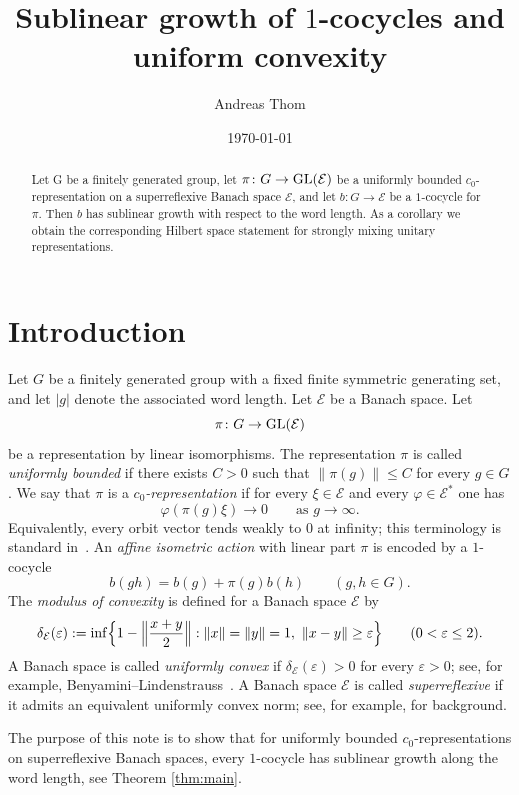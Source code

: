 \documentclass[a4paper,11pt]{amsproc}
\title[Sublinear growth and uniform convexity]{Sublinear growth of $1$-cocycles and \\ uniform convexity}
\author{Andreas Thom}
\date{\today}
\theoremstyle{remark}
\newcommand{\norm}[1]{\left\lVert #1\right\rVert}
\newcommand{\cE}{\mathcal E}
\begin{document}
\begin{abstract}

Let G be a finitely generated group, let $\pi \colon G \to {\rm GL}(\cE)$ be a uniformly bounded $c_0$-representation on a superreflexive Banach space $\cE$, and let $b \colon G \to \cE$ be a $1$-cocycle for $\pi$. Then $b$ has sublinear growth with respect to the word length. As a corollary we obtain the corresponding Hilbert space statement for strongly mixing unitary representations.
\end{abstract}

\maketitle

\section{Introduction}

Let $G$ be a finitely generated group with a fixed finite symmetric generating set, and let $|g|$ denote the associated word length. Let $\cE$ be a Banach space. Let
\[
\pi\colon G\to {\rm GL}(\cE)
\]
be a representation by linear isomorphisms. The representation $\pi$ is called \emph{uniformly bounded} if there exists $C>0$ such that $\norm{\pi(g)}\le C$ for every $g\in G$. We say that $\pi$ is a \emph{$c_{0}$-representation} if for every $\xi\in \cE$ and every $\varphi\in \cE^{\ast}$ one has
\[
\varphi(\pi(g)\xi)\to 0
\qquad\text{as } g\to\infty.
\]
Equivalently, every orbit vector tends weakly to $0$ at infinity; this terminology is standard in~\cite{BFGM07,CTVBanach08}.
An \emph{affine isometric action} with linear part $\pi$ is encoded by a $1$-cocycle
\[
b(gh)=b(g)+\pi(g)b(h)
\qquad (g,h\in G).
\]
The \emph{modulus of convexity} is defined for a Banach space $\cE$ by
\[
\delta_{\cE}(\varepsilon):=\inf\Bigl\{1-\Bigl\lVert\frac{x+y}{2}\Bigr\rVert: \norm{x}=\norm{y}=1,\ \norm{x-y}\ge \varepsilon\Bigr\}
\qquad (0<\varepsilon\le 2).
\]
A Banach space is called \emph{uniformly convex} if $\delta_{\cE}(\varepsilon)>0$ for every $\varepsilon>0$; see, for example, Benyamini--Lindenstrauss~\cite{BL00}. A Banach space $\cE$ is called \emph{superreflexive} if it admits an equivalent uniformly convex norm; see, for example, \cite{BFGM07,BL00} for background.

The purpose of this note is to show that for uniformly bounded $c_{0}$-representations on superreflexive Banach spaces, every $1$-cocycle has sublinear growth along the word length, see Theorem \ref{thm:main}. 
\end{document}
